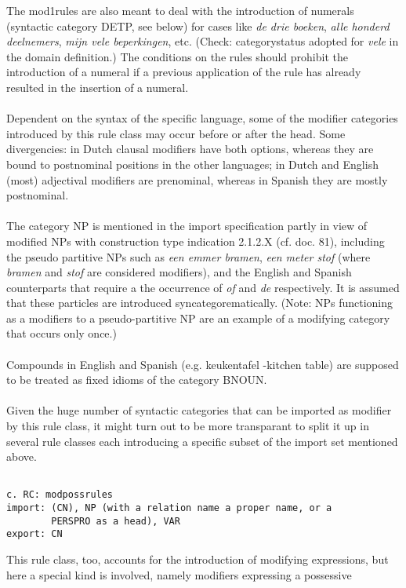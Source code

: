 The mod1rules are also meant to deal with the introduction of numerals
(syntactic category DETP, see below) for cases like {\em de drie boeken}, 
{\em
alle honderd deelnemers}, {\em mijn vele beperkingen}, etc. (Check:
categorystatus adopted for {\em vele} in the domain definition.) The conditions
on the rules should prohibit the introduction of a numeral if a previous
application of the rule has already resulted in the insertion of a numeral.
\\ \\ 
Dependent on the syntax of the specific language, some of the modifier
categories introduced by this rule class may occur before or after the head.
Some divergencies: in Dutch clausal modifiers have both options, whereas they
are bound to postnominal positions in the other languages; in Dutch and English
(most) adjectival modifiers are prenominal, whereas in Spanish they are mostly
postnominal.
\\ \\ 
The category NP is mentioned in the import specification partly in view of
modified NPs with construction type indication 2.1.2.X (cf. doc. 81), including
the pseudo partitive NPs such as {\em een emmer bramen}, {\em een meter stof}
(where {\em bramen} and {\em stof} are considered modifiers), and the English
and Spanish counterparts that require a the occurrence of {\em of} and {\em de}
respectively. It is assumed that these particles are introduced
syncategorematically. (Note: NPs functioning as a modifiers to a
pseudo-partitive NP are an example of a modifying category that occurs only
once.)\\ \\ 
Compounds in English and Spanish (e.g. keukentafel -kitchen table) are supposed
to be treated as fixed idioms of the category BNOUN.\\ \\ 
Given the huge number of syntactic categories that can be imported as modifier
by this rule class, it might turn out to be more transparant to split it up in
several rule classes each introducing a specific subset of the import set
mentioned above. 
\begin{verbatim}

c. RC: modpossrules
import: (CN), NP (with a relation name a proper name, or a 
        PERSPRO as a head), VAR
export: CN 
\end{verbatim}
This rule class, too, accounts for the introduction of modifying expressions,
but here a special kind is involved, namely modifiers expressing a possessive
